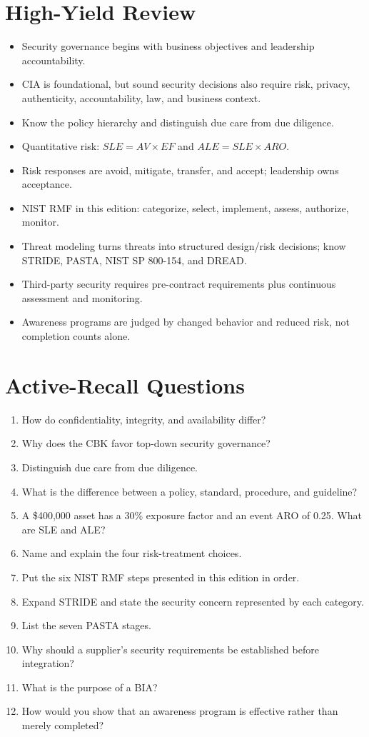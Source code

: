 \documentclass[10pt,letterpaper]{article}
\begin{document}
\section{High-Yield Review}
\begin{itemize}
\item Security governance begins with business objectives and leadership accountability.
\item CIA is foundational, but sound security decisions also require risk, privacy, authenticity, accountability, law, and business context.
\item Know the policy hierarchy and distinguish due care from due diligence.
\item Quantitative risk: \(SLE=AV\times EF\) and \(ALE=SLE\times ARO\).
\item Risk responses are avoid, mitigate, transfer, and accept; leadership owns acceptance.
\item NIST RMF in this edition: categorize, select, implement, assess, authorize, monitor.
\item Threat modeling turns threats into structured design/risk decisions; know STRIDE, PASTA, NIST SP 800-154, and DREAD.
\item Third-party security requires pre-contract requirements plus continuous assessment and monitoring.
\item Awareness programs are judged by changed behavior and reduced risk, not completion counts alone.
\end{itemize}

\section{Active-Recall Questions}
\begin{enumerate}
\item How do confidentiality, integrity, and availability differ?
\item Why does the CBK favor top-down security governance?
\item Distinguish due care from due diligence.
\item What is the difference between a policy, standard, procedure, and guideline?
\item A \$400,000 asset has a 30\% exposure factor and an event ARO of 0.25. What are SLE and ALE?
\item Name and explain the four risk-treatment choices.
\item Put the six NIST RMF steps presented in this edition in order.
\item Expand STRIDE and state the security concern represented by each category.
\item List the seven PASTA stages.
\item Why should a supplier's security requirements be established before integration?
\item What is the purpose of a BIA?
\item How would you show that an awareness program is effective rather than merely completed?
\end{enumerate}
\end{document}

